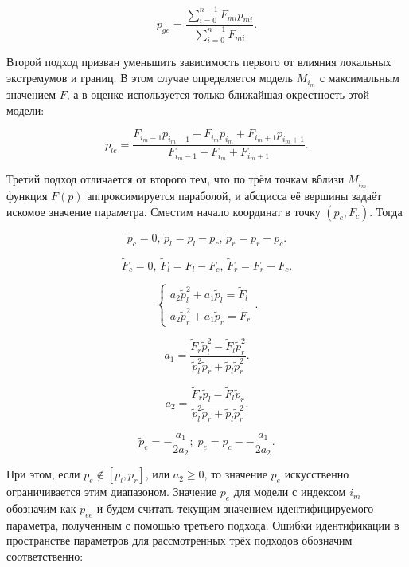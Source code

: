 \documentclass[a4paper,paratype,12pt,fouriernc]{cmonogra}
\begin{document}
\begin{equation}
  p_{ge}
  =
  \frac{\sum\limits_{i=0}^{n-1} F_{mi} p_{mi}}
       {\sum\limits_{i=0}^{n-1} F_{mi} }
  .
  \label{atu:eq:p_ge}
\end{equation}

Второй подход призван уменьшить зависимость первого
от влияния локальных экстремумов и границ. В этом
случае определяется модель $M_{i_{m}}$ с максимальным значением
$F$, а в оценке используется только ближайшая окрестность этой модели:

\begin{equation}
  p_{le}
  =
  \frac{ F_{i_m-1} p_{i_m-1} + F_{i_m} p_{i_m} + F_{i_m+1} p_{i_m+1} }
       { F_{i_m-1} + F_{i_m} + F_{i_m+1} }
  .
  \label{atu:eq:p_le}
\end{equation}

Третий подход отличается от второго тем, что по трём точкам вблизи  $M_{i_{m}}$
функция $F(p)$ аппроксимируется параболой, и абсцисса её вершины задаёт искомое
значение параметра. Сместим начало координат в точку
$ ( p_c, F_c ) $. Тогда

\[
  \tilde{p}_c = 0, \,
  \tilde{p}_l = p_l - p_c, \,
  \tilde{p}_r = p_r - p_c.
\]

\[
  \tilde{F}_c = 0, \,
  \tilde{F}_l = F_l - F_c, \,
  \tilde{F}_r = F_r - F_c.
\]

\[
  \left\{
    \begin{array}{l}
      a_2 \tilde{p}_l^2 + a_1 \tilde{p}_l  = \tilde{F}_l
      \\
      a_2 \tilde{p}_r^2 + a_1 \tilde{p}_r  = \tilde{F}_r
    \end{array}
  \right. .
\]

\[
  a_1 = \frac{\tilde{F}_r \tilde{p}_l^2 - \tilde{F}_l \tilde{p}_r^2 }
             { \tilde{p}_l^2 \tilde{p}_r  + \tilde{p}_l \tilde{p}_r^2 }.
\]

\[
  a_2 = \frac{\tilde{F}_r \tilde{p}_l - \tilde{F}_l \tilde{p}_r }
             { \tilde{p}_l^2 \tilde{p}_r  + \tilde{p}_l \tilde{p}_r^2 }.
\]

\begin{equation}
  \tilde{p}_e = - \frac{a_1}{2 a_2};
  \;
  p_e = p_c -- \frac{a_1}{2 a_2}.
  \label{atu:eq:p_e}
\end{equation}


При этом, если
$ p_e \notin [ p_l, p_r ] $, или $ a_2 \ge 0 $, то значение $p_e$ искусственно
ограничивается этим диапазоном. Значение $p_e$ для модели с индексом
$i_m$ обозначим как $p_{ee}$ и будем считать
текущим значением идентифицируемого параметра, полученным с помощью
третьего подхода. Ошибки идентификации в пространстве параметров
для рассмотренных трёх подходов обозначим соответственно:
\end{document}
